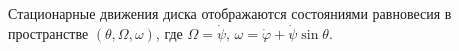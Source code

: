 Стационарные движения диска отображаются состояниями равновесия
в пространстве $(\theta, \Omega, \omega)$, где
$\Omega = \dot{\psi}$, $\omega = \dot{\varphi} + \dot{\psi}\sin{\theta}$.
